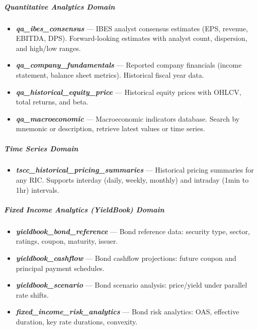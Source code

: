 \documentclass[11pt]{article}
\begin{document}
\subparagraph{Quantitative Analytics Domain}\mbox{}\par
\begin{itemize}[leftmargin=*,itemsep=2pt,topsep=2pt]
\item {} \textbf{\emph{qa\_\allowbreak{}ibes\_\allowbreak{}consensus}} — IBES analyst consensus estimates (EPS, revenue, EBITDA, DPS). Forward-looking estimates with analyst count, dispersion, and high/low ranges.
\item {} \textbf{\emph{qa\_\allowbreak{}company\_\allowbreak{}fundamentals}} — Reported company financials (income statement, balance sheet metrics). Historical fiscal year data.
\item {} \textbf{\emph{qa\_\allowbreak{}historical\_\allowbreak{}equity\_\allowbreak{}price}} — Historical equity prices with OHLCV, total returns, and beta.
\item {} \textbf{\emph{qa\_\allowbreak{}macroeconomic}} — Macroeconomic indicators database. Search by mnemonic or description, retrieve latest values or time series.
\end{itemize}

\subparagraph{Time Series Domain}\mbox{}\par
\begin{itemize}[leftmargin=*,itemsep=2pt,topsep=2pt]
\item {} \textbf{\emph{tscc\_\allowbreak{}historical\_\allowbreak{}pricing\_\allowbreak{}summaries}} — Historical pricing summaries for any RIC. Supports interday (daily, weekly, monthly) and intraday (1min to 1hr) intervals.
\end{itemize}

\subparagraph{Fixed Income Analytics (YieldBook) Domain}\mbox{}\par
\begin{itemize}[leftmargin=*,itemsep=2pt,topsep=2pt]
\item {} \textbf{\emph{yieldbook\_\allowbreak{}bond\_\allowbreak{}reference}} — Bond reference data: security type, sector, ratings, coupon, maturity, issuer.
\item {} \textbf{\emph{yieldbook\_\allowbreak{}cashflow}} — Bond cashflow projections: future coupon and principal payment schedules.
\item {} \textbf{\emph{yieldbook\_\allowbreak{}scenario}} — Bond scenario analysis: price/yield under parallel rate shifts.
\item {} \textbf{\emph{fixed\_\allowbreak{}income\_\allowbreak{}risk\_\allowbreak{}analytics}} — Bond risk analytics: OAS, effective duration, key rate durations, convexity.
\end{itemize}
\end{document}

